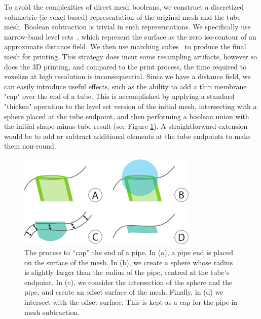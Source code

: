 To avoid the complexities of direct mesh booleans, we construct a discretized volumetric
(ie voxel-based) representation of the original mesh and the tube mesh. Boolean
subtraction is trivial in such representations. We specifically use narrow-band
level sets~\cite{Museth04}, which represent the surface as the zero iso-contour of an
approximate distance field.
We then use marching cubes~\cite{Lorensen87} to produce the final mesh for printing.
This strategy does incur some resampling artifacts, however so does the 3D printing, and compared to the print process, the time required to voxelize at high resolution is inconsequential.
Since we have a distance field, we can easily introduce useful effects, such as the
ability to add a thin membrane "cap" over the end of a tube. 
This is accomplished by applying a standard "thicken" operation to the level set version
of the initial mesh, intersecting with a sphere placed at the tube endpoint, and then performing
a boolean union with the initial shape-minus-tube result (see Figure \ref{fig:cap}).
A straightforward extension would be to add or subtract additional elements at
the tube endpoints to make them non-round.

\begin{figure}[h!]
\centering
    \includegraphics[width=3.4in]{figures/cap.pdf}
\caption{The process to ``cap'' the end of a pipe.  In (a), a pipe end is placed on the surface of the mesh.  In (b), we create a sphere whose radius is slightly larger than the radius of the pipe, centred at the tube's endpoint.  In (c), we consider the intersection of the sphere and the pipe, and create an offset surface of the mesh.  Finally, in (d) we intersect with the offset surface.  This is kept as a cap for the pipe in mesh subtraction.}
\label{fig:cap}
\end{figure}

